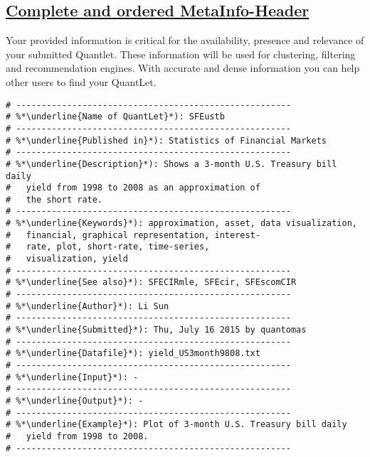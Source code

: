 \documentclass{article}
\begin{document}
\subsection{\label{MetaInfo}\hyperref[MetaInfo-ini]{Complete and ordered MetaInfo-Header}}
Your provided information is critical for the availability, presence and relevance of your submitted Quantlet. These information will be used for clustering, filtering and recommendation engines. With accurate and dense information you can help other users to find your QuantLet.
\begin{lstlisting}[frame=single]
# ------------------------------------------------------
# %*\underline{Name of QuantLet}*): SFEustb
# ------------------------------------------------------
# %*\underline{Published in}*): Statistics of Financial Markets
# ------------------------------------------------------
# %*\underline{Description}*): Shows a 3-month U.S. Treasury bill daily 
# 	yield from 1998 to 2008 as an approximation of 
#	the short rate.
# ------------------------------------------------------
# %*\underline{Keywords}*): approximation, asset, data visualization, 
#	financial, graphical representation, interest-
#	rate, plot, short-rate, time-series, 
#	visualization, yield
# ------------------------------------------------------
# %*\underline{See also}*): SFECIRmle, SFEcir, SFEscomCIR
# ------------------------------------------------------
# %*\underline{Author}*): Li Sun
# ------------------------------------------------------
# %*\underline{Submitted}*): Thu, July 16 2015 by quantomas
# ------------------------------------------------------
# %*\underline{Datafile}*): yield_US3month9808.txt
# ------------------------------------------------------
# %*\underline{Input}*): -
# ------------------------------------------------------
# %*\underline{Output}*): -
# ------------------------------------------------------
# %*\underline{Example}*): Plot of 3-month U.S. Treasury bill daily 
# 	yield from 1998 to 2008. 
# ------------------------------------------------------
\end{lstlisting}
\newpage
\end{document}
